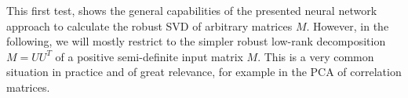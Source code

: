 This first test, shows the general capabilities of the presented neural network approach to calculate the robust SVD of arbitrary matrices $M$. However, in the following, we will mostly restrict to the simpler robust low-rank decomposition $M = UU^T$ of a positive semi-definite input matrix $M$. This is a very common situation in practice and of great relevance, for example in the PCA of correlation matrices.


